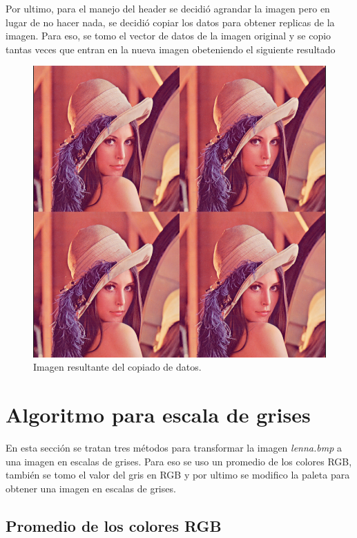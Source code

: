 Por ultimo, para el manejo del header se decidió agrandar la imagen pero en lugar de no hacer nada, se decidió copiar los datos para obtener replicas de la imagen. Para eso, se tomo el vector de datos de la imagen original y se copio tantas veces que entran en la nueva imagen obeteniendo el siguiente resultado

\begin{figure}[H]
	\centering
	\includegraphics[scale=0.5]{imagenes/copiadoRGB.png}
	\caption{Imagen resultante del copiado de datos.}
\end{figure}

\section{Algoritmo para escala de grises}

En esta sección se tratan tres métodos para transformar la imagen \textit{lenna.bmp} a una imagen en escalas de grises. Para eso se uso un promedio de los colores RGB, también se tomo el valor del gris en RGB y por ultimo se modifico la paleta para obtener una imagen en escalas de grises. 

\subsection{Promedio de los colores RGB}

